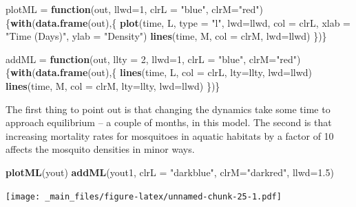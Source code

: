 \documentclass[
]{book}
\newenvironment{Shaded}{\begin{snugshade}}{\end{snugshade}}
\newcommand{\AttributeTok}[1]{\textcolor[rgb]{0.13,0.29,0.53}{#1}}
\newcommand{\ControlFlowTok}[1]{\textcolor[rgb]{0.13,0.29,0.53}{\textbf{#1}}}
\newcommand{\DecValTok}[1]{\textcolor[rgb]{0.00,0.00,0.81}{#1}}
\newcommand{\FloatTok}[1]{\textcolor[rgb]{0.00,0.00,0.81}{#1}}
\newcommand{\FunctionTok}[1]{\textcolor[rgb]{0.13,0.29,0.53}{\textbf{#1}}}
\newcommand{\NormalTok}[1]{#1}
\newcommand{\OtherTok}[1]{\textcolor[rgb]{0.56,0.35,0.01}{#1}}
\newcommand{\StringTok}[1]{\textcolor[rgb]{0.31,0.60,0.02}{#1}}
\begin{document}
\begin{Shaded}
\begin{Highlighting}[]
\NormalTok{plotML }\OtherTok{=} \ControlFlowTok{function}\NormalTok{(out, }\AttributeTok{llwd=}\DecValTok{1}\NormalTok{, }\AttributeTok{clrL =} \StringTok{"blue"}\NormalTok{, }\AttributeTok{clrM=}\StringTok{"red"}\NormalTok{)\{}\FunctionTok{with}\NormalTok{(}\FunctionTok{data.frame}\NormalTok{(out),\{}
  \FunctionTok{plot}\NormalTok{(time, L, }\AttributeTok{type =} \StringTok{"l"}\NormalTok{, }\AttributeTok{lwd=}\NormalTok{llwd, }\AttributeTok{col =}\NormalTok{ clrL, }\AttributeTok{xlab =} \StringTok{"Time (Days)"}\NormalTok{, }\AttributeTok{ylab =} \StringTok{"Density"}\NormalTok{) }
  \FunctionTok{lines}\NormalTok{(time, M, }\AttributeTok{col =}\NormalTok{ clrM, }\AttributeTok{lwd=}\NormalTok{llwd) }
\NormalTok{\})\}}

\NormalTok{addML }\OtherTok{=} \ControlFlowTok{function}\NormalTok{(out, }\AttributeTok{llty =} \DecValTok{2}\NormalTok{, }\AttributeTok{llwd=}\DecValTok{1}\NormalTok{, }\AttributeTok{clrL =} \StringTok{"blue"}\NormalTok{, }\AttributeTok{clrM=}\StringTok{"red"}\NormalTok{)\{}\FunctionTok{with}\NormalTok{(}\FunctionTok{data.frame}\NormalTok{(out),\{}
  \FunctionTok{lines}\NormalTok{(time, L, }\AttributeTok{col =}\NormalTok{ clrL, }\AttributeTok{lty=}\NormalTok{llty, }\AttributeTok{lwd=}\NormalTok{llwd) }
  \FunctionTok{lines}\NormalTok{(time, M, }\AttributeTok{col =}\NormalTok{ clrM, }\AttributeTok{lty=}\NormalTok{llty, }\AttributeTok{lwd=}\NormalTok{llwd) }
\NormalTok{\})\}}
\end{Highlighting}
\end{Shaded}

The first thing to point out is that changing the dynamics take some time to approach equilibrium -- a couple of months, in this model. The second is that increasing mortality rates for mosquitoes in aquatic habitats by a factor of 10 affects the mosquito densities in minor ways.

\begin{Shaded}
\begin{Highlighting}[]
\FunctionTok{plotML}\NormalTok{(yout)}
\FunctionTok{addML}\NormalTok{(yout1, }\AttributeTok{clrL =} \StringTok{"darkblue"}\NormalTok{, }\AttributeTok{clrM=}\StringTok{"darkred"}\NormalTok{, }\AttributeTok{llwd=}\FloatTok{1.5}\NormalTok{)}
\end{Highlighting}
\end{Shaded}

\texttt{[image: \_main\_files/figure-latex/unnamed-chunk-25-1.pdf]}
\end{document}
